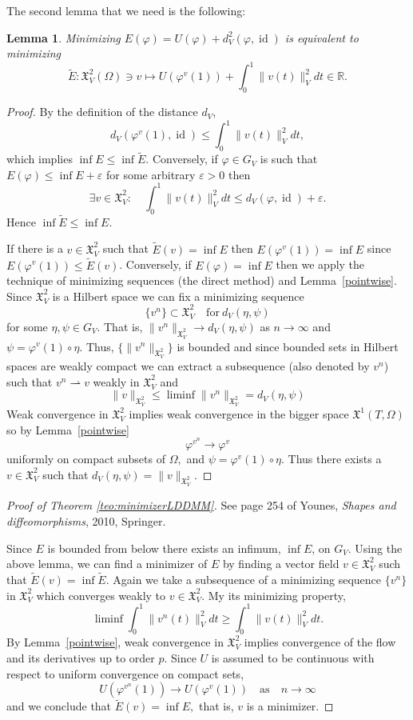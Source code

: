 \documentclass[a5paper,10pt,twoside]{article}
\newcommand{\R}{\ensuremath{\mathbb{R}}}
\newcommand{\X}{\ensuremath{\mathfrak{X}}}
\DeclareMathOperator*{\id}{id}
\theoremstyle{plain}
\newtheorem{lem}[teo]{Lemma}
\theoremstyle{definition}
\theoremstyle{remark}
\begin{document}
The second lemma that we need is the following:

\begin{lem}
Minimizing $E(\varphi)=U(\varphi)+d_V^2(\varphi,\id)$ is equivalent to minimizing
$$ \tilde{E}:\X_V^2(\Omega)\ni v\mapsto U(\varphi^v(1))+\int_0^1\|v(t)\|_V^2dt\in\R. $$
\end{lem}

\begin{proof}
By the definition of the distance $d_V$,
$$
d_V(\varphi^v(1),\id)\leq \int_0^1 \|v(t)\|_V^2 dt,
$$
which implies $\inf E\leq \inf \tilde{E}$. Conversely, if $\varphi\in G_V$ is such that $E(\varphi)\leq \inf E +\varepsilon$ for some arbitrary $\varepsilon>0$ then
$$
\exists v\in \X^2_V : \quad \int_0^1\|v(t)\|_V^2dt\leq d_V(\varphi,\id)+\varepsilon.
$$
Hence $\inf \tilde{E}\leq \inf E$.

If there is a $v\in\X_V^2$ such that $\tilde{E}(v)=\inf E$ then $E(\varphi^v(1))=\inf E$ since $E(\varphi^v(1))\leq \tilde{E}(v)$. Conversely, if $E(\varphi)=\inf E$ then we apply the technique of minimizing sequences (the direct method) and Lemma~\ref{pointwise}. Since $\X_V^2$ is a Hilbert space we can fix a minimizing sequence
$$
\{v^n\}\subset\X_V^2\quad\mathrm{for}\ d_V(\eta,\psi)
$$
for some $\eta,\psi\in G_V.$ That is, $\|v^n\|_{\X_V^2}\to d_V(\eta,\psi)$ as $n\to\infty$ and $\psi=\varphi^v(1)\circ \eta.$ Thus, $\{\|v^n\|_{\X_V^2}\}$ is bounded and since bounded sets in Hilbert spaces are weakly compact we can extract a subsequence (also denoted by $v^n$) such that $v^n\rightharpoonup v$ weakly in $\X_V^2$ and 
$$
\|v\|_{\X_V^2}\leq \liminf \|v^n\|_{\X_V^2} =d_V(\eta,\psi)
$$
Weak convergence in $\X_V^2$ implies weak convergence in the bigger space $\X^1(T,\Omega)$ so by Lemma~\ref{pointwise}
$$
\varphi^{v^n}\to\varphi^v
$$
uniformly on compact subsets of $\Omega,$ and $\psi=\varphi^v(1)\circ\eta.$ Thus there exists a $v\in\X_V^2$ such that $d_V(\eta,\psi)=\|v\|_{\X_V^2}.$

\end{proof}

\begin{proof}[Proof of Theorem \ref{teo:minimizerLDDMM}]
See page 254 of Younes, \textit{Shapes and diffeomorphisms}, 2010, Springer.

Since $E$ is bounded from below there exists an infimum, $\inf E$, on $G_V$. Using the above lemma, we can find a minimizer of $E$ by finding a vector field $v\in\X_V^2$ such that $\tilde{E}(v)=\inf \tilde{E}.$ Again we take a subsequence of a minimizing sequence $\{v^n\}$ in $\X_V^2$ which converges weakly to $v\in\X_V^2$. My its minimizing property, 
$$
\liminf \int_0^1\|v^n(t)\|_V^2dt\geq \int_0^1\|v(t)\|_V^2dt.
$$
By Lemma~\ref{pointwise}, weak convergence in $\X_V^2$ implies convergence of the flow and its derivatives up to order $p$. Since $U$ is assumed to be continuous with respect to uniform convergence on compact sets, 
$$
U(\varphi^{v^n}(1))\to U(\varphi^v(1))\quad \mathrm{as}\quad n\to \infty
$$ 
and we conclude that $\tilde{E}(v)=\inf E,$ that is, $v$ is a  minimizer.
\end{proof}
\end{document}
